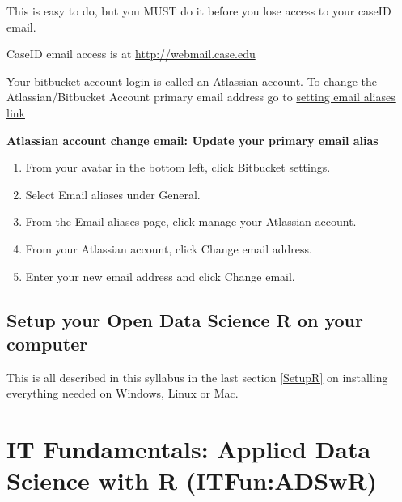 \documentclass[11pt]{article} %
\begin{document}
    This is easy to do, but you MUST do it before you lose access to your caseID email. 
    
    CaseID email access is at \url{http://webmail.case.edu}
    
    Your bitbucket account login is called an Atlassian account. To change the Atlassian/Bitbucket Account primary email address go to \href{https://confluence.atlassian.com/bitbucket/set-email-aliases-792298714.html}{setting email aliases link}
    
    {\bf Atlassian account change email: Update your primary email alias}
    \begin{enumerate}
      \itemsep0em 
      \item From your avatar in the bottom left, click Bitbucket settings.
      \item Select Email aliases under General.
      \item From the Email aliases page, click manage your Atlassian account.
      \item From your Atlassian account, click Change email address.
      \item Enter your new email address and click Change email.
    \end{enumerate}
  
  \subsection{Setup your Open Data Science R on your computer}
  
    This is all described in this syllabus in the last section \ref{SetupR} on installing everything needed on Windows, Linux or Mac.
  
\section{IT Fundamentals: Applied Data Science with R (ITFun:ADSwR)}

%
\end{document}
